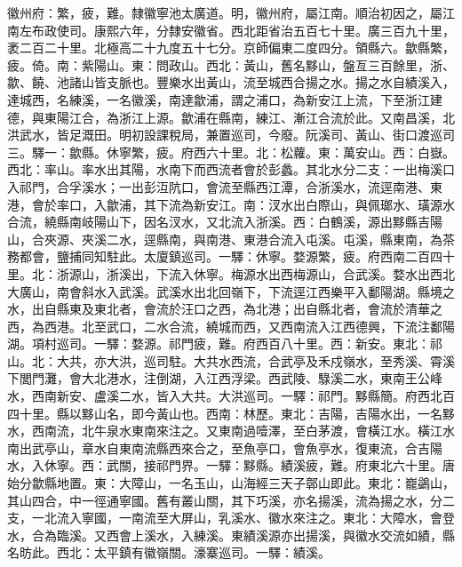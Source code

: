 \begin{pinyinscope}
徽州府：繁，疲，難。隸徽寧池太廣道。明，徽州府，屬江南。順治初因之，屬江南左布政使司。康熙六年，分隸安徽省。西北距省治五百七十里。廣三百九十里，袤二百二十里。北極高二十九度五十七分。京師偏東二度四分。領縣六。歙縣繁，疲。倚。南：紫陽山。東：問政山。西北：黃山，舊名黟山，盤亙三百餘里，浙、歙、饒、池諸山皆支脈也。豐樂水出黃山，流至城西合揚之水。揚之水自績溪入，達城西，名練溪，一名徽溪，南達歙浦，謂之浦口，為新安江上流，下至浙江建德，與東陽江合，為浙江上源。歙浦在縣南，練江、漸江合流於此。又南昌溪，北洪武水，皆足溉田。明初設課稅局，兼置巡司，今廢。阮溪司、黃山、街口渡巡司三。驛一：歙縣。休寧繁，疲。府西六十里。北：松蘿。東：萬安山。西：白嶽。西北：率山。率水出其陽，水南下而西流者會於彭蠡。其北水分二支：一出梅溪口入祁門，合孚溪水；一出彭沍阬口，會流至縣西江潭，合浙溪水，流逕南港、東港，會於率口，入歙浦，其下流為新安江。南：汊水出白際山，與佩瑯水、璜源水合流，繞縣南岐陽山下，因名汊水，又北流入浙溪。西：白鶴溪，源出黟縣吉陽山，合夾源、夾溪二水，逕縣南，與南港、東港合流入屯溪。屯溪，縣東南，為茶務都會，鹽捕同知駐此。太廈鎮巡司。一驛：休寧。婺源繁，疲。府西南二百四十里。北：浙源山，浙溪出，下流入休寧。梅源水出西梅源山，合武溪。婺水出西北大廣山，南會斜水入武溪。武溪水出北回嶺下，下流逕江西樂平入鄱陽湖。縣境之水，出自縣東及東北者，會流於汪口之西，為北港；出自縣北者，會流於清華之西，為西港。北至武口，二水合流，繞城而西，又西南流入江西德興，下流注鄱陽湖。項村巡司。一驛：婺源。祁門疲，難。府西百八十里。西：新安。東北：祁山。北：大共，亦大洪，巡司駐。大共水西流，合武亭及禾戍嶺水，至秀溪、霄溪下閭門灘，會大北港水，注倒湖，入江西浮梁。西武陵、騄溪二水，東南王公峰水，西南新安、盧溪二水，皆入大共。大洪巡司。一驛：祁門。黟縣簡。府西北百四十里。縣以黟山名，即今黃山也。西南：林歷。東北：吉陽，吉陽水出，一名黟水，西南流，北牛泉水東南來注之。又東南過噎澤，至白茅渡，會橫江水。橫江水南出武亭山，章水自東南流縣西來合之，至魚亭口，會魚亭水，復東流，合吉陽水，入休寧。西：武關，接祁門界。一驛：黟縣。績溪疲，難。府東北六十里。唐始分歙縣地置。東：大障山，一名玉山，山海經三天子鄣山即此。東北：巃鷁山，其山四合，中一徑通寧國。舊有叢山關，其下巧溪，亦名揚溪，流為揚之水，分二支，一北流入寧國，一南流至大屏山，乳溪水、徽水來注之。東北：大障水，會登水，合為臨溪。又西會上溪水，入練溪。東績溪源亦出揚溪，與徽水交流如績，縣名昉此。西北：太平鎮有徽嶺關。濠寨巡司。一驛：績溪。


\end{pinyinscope}
